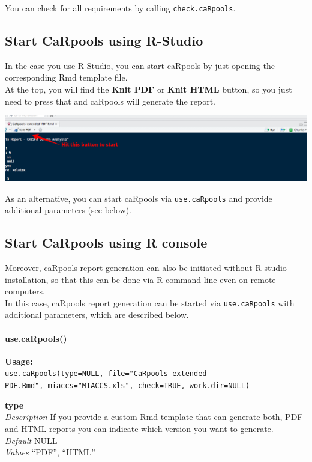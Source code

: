 \documentclass[]{article}
\let\oldparagraph\paragraph
\renewcommand{\paragraph}[1]{\oldparagraph{#1}\mbox{}}
\begin{document}
You can check for all requirements by calling \texttt{check.caRpools}.

\subsection{Start CaRpools using
R-Studio}\label{start-carpools-using-r-studio}

In the case you use R-Studio, you can start caRpools by just opening the
corresponding Rmd template file.\\
At the top, you will find the \textbf{Knit PDF} or \textbf{Knit HTML}
button, so you just need to press that and caRpools will generate the
report.

\includegraphics{./pictures/rstudio-knit.png}

As an alternative, you can start caRpools via \texttt{use.caRpools} and
provide additional parameters (see below).

\subsection{Start CaRpools using R
console}\label{start-carpools-using-r-console}

Moreover, caRpools report generation can also be initiated without
R-studio installation, so that this can be done via R command line even
on remote computers.\\
In this case, caRpools report generation can be started via
\texttt{use.caRpools} with additional parameters, which are described
below.

\paragraph{use.caRpools()}\label{use.carpools}

\textbf{Usage:}\\
\texttt{use.caRpools(type=NULL,\ file="CaRpools-extended-PDF.Rmd",\ miaccs="MIACCS.xls",\ check=TRUE,\ work.dir=NULL)}

\textbf{type}\\
\emph{Description} If you provide a custom Rmd template that can
generate both, PDF and HTML reports you can indicate which version you
want to generate.\\
\emph{Default} NULL\\
\emph{Values} ``PDF'', ``HTML''
\end{document}
